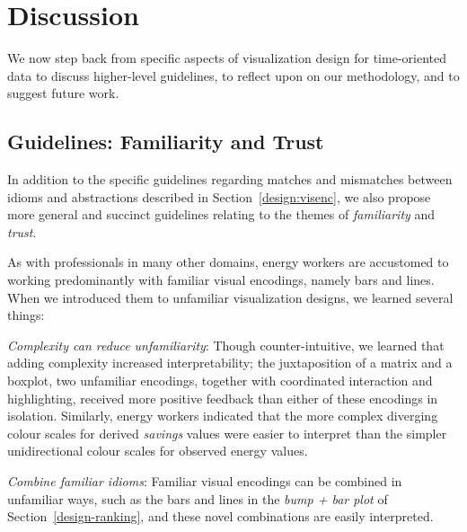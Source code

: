 \documentclass[journal]{vgtc}                %
\newcommand{\bstart}[1]{\vspace{1mm} \noindent{\textbf{#1:}}}
\begin{document}
\section{Discussion}
\label{discussion}


We now step back from specific aspects of visualization design for time-oriented data to discuss higher-level guidelines, to reflect upon on our methodology, and to suggest future work.


\subsection{Guidelines: Familiarity and Trust}
\label{discussion-guidelines}


In addition to the specific guidelines regarding matches and mismatches between idioms and abstractions described in Section~\ref{design:visenc}, we also propose more general and succinct guidelines relating to the themes of {\it familiarity} and {\it trust}.

\bstart{Familiarity} As with professionals in many other domains, energy workers are accustomed to working predominantly with familiar visual encodings, namely bars and lines.
When we introduced them to unfamiliar visualization designs, we learned several things:

{\it Complexity can reduce unfamiliarity}: Though counter-intuitive, we learned that adding complexity increased interpretability; the juxtaposition of a matrix and a boxplot, two unfamiliar encodings, together with coordinated interaction and highlighting, received more positive feedback than either of these encodings in isolation.
Similarly, energy workers indicated that the more complex diverging colour scales for derived {\it savings} values were easier to interpret than the simpler unidirectional colour scales for observed energy values. %

{\it Combine familiar idioms}: Familiar visual encodings can be combined in unfamiliar ways, such as the bars and lines in the {\it bump + bar plot} of Section~\ref{design-ranking}, and these novel combinations are easily interpreted.
\end{document}
